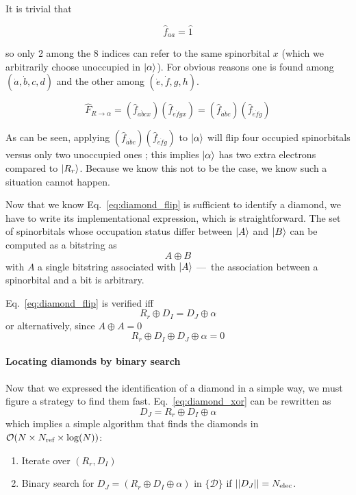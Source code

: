 \documentclass[./thesis.tex]{subfiles}
\begin{document}
It is trivial that

\begin{equation}
\hat f_{aa} = \hat 1
\end{equation}

so only 2 among the 8 indices can refer to the same spinorbital $x$ (which we arbitrarily choose unoccupied in ${\ket{\alpha}}$). For obvious reasons one is found among $(\dot a,\dot b,c,d)$ and the other among $(\dot e,\dot f,g,h)$.

\begin{equation}
\hat F_{R \rightarrow \alpha} = (\hat f_{\dot a \dot bcx})(\hat f_{\dot e \dot fgx}) = (\hat f_{\dot a \dot bc})(\hat f_{\dot e \dot fg})
\end{equation}

As can be seen, applying $(\hat f_{\dot a \dot bc})(\hat f_{\dot e \dot fg})$ to ${\ket{\alpha}}$ will flip four occupied spinorbitals versus only two unoccupied ones ; this implies ${\ket{\alpha}}$ has two extra electrons compared to $\ket {R_r}$. Because we know this not to be the case, we know such a situation cannot happen.

Now that we know Eq.~\eqref{eq:diamond_flip} is sufficient to identify a diamond, we have to write its implementational expression, which is straightforward. The set of spinorbitals whose occupation status differ between $\ket A$ and $\ket B$ can be computed as a bitstring as
\begin{equation}
A \oplus B
\end{equation}
with $A$ a single bitstring associated with $\ket A$ ---~the association between a spinorbital and a bit is arbitrary.

Eq.~\eqref{eq:diamond_flip} is verified iff
\begin{equation}
R_r \oplus D_I = D_J \oplus \alpha
\end{equation}
or alternatively, since $A \oplus A = 0$
\begin{equation}
R_r \oplus D_I \oplus D_J \oplus \alpha = 0
\label{eq:diamond_xor}
\end{equation}

\paragraph{Locating diamonds by binary search}
Now that we expressed the identification of a diamond in a simple way, we must figure a strategy to find them fast. Eq.~\eqref{eq:diamond_xor} can be rewritten as
\begin{equation}
D_J = R_r \oplus D_I \oplus \alpha
\end{equation}
which implies a simple algorithm that finds the diamonds in $\mathcal{O}(N \times {N_\text{ref}} \times \log(N))$:
\begin{enumerate}
\item
Iterate over $(R_r, D_I)$
\item
Binary search for $D_J = (R_r \oplus D_I \oplus \alpha)$ in $\{\mathcal{D}\}$ if $||D_J|| = {N_\text{elec}}$.
\end{enumerate}
\end{document}
